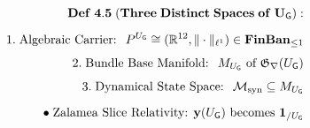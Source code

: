 \documentclass[preview]{standalone}
\begin{document}
\begin{align*}
\special{dvisvgm:raw <g id='unique000'>}\mathbf{Def\;4.5\;(Three\;Distinct\;Spaces\;of\;U_{\mathsf{G}}):}\\[5pt]1.\;\text{Algebraic Carrier: }\; P^{U_{\mathsf{G}}}\cong(\mathbb{R}^{12},\|\cdot\|_{\ell^1})\in\mathbf{FinBan}_{\le 1}\\[4pt]2.\;\text{Bundle Base Manifold: }\; M_{U_{\mathsf{G}}}\text{ of }\mathfrak{G}_\nabla(U_{\mathsf{G}})\\[4pt]3.\;\text{Dynamical State Space: }\; \mathcal{M}_{\text{syn}}\subseteq M_{U_{\mathsf{G}}}\\[6pt]\bullet\;\text{Zalamea Slice Relativity: }\mathbf{y}(U_{\mathsf{G}})\text{ becomes }\mathbf{1}_{/U_{\mathsf{G}}}\special{dvisvgm:raw </g>}
\end{align*}
\end{document}

